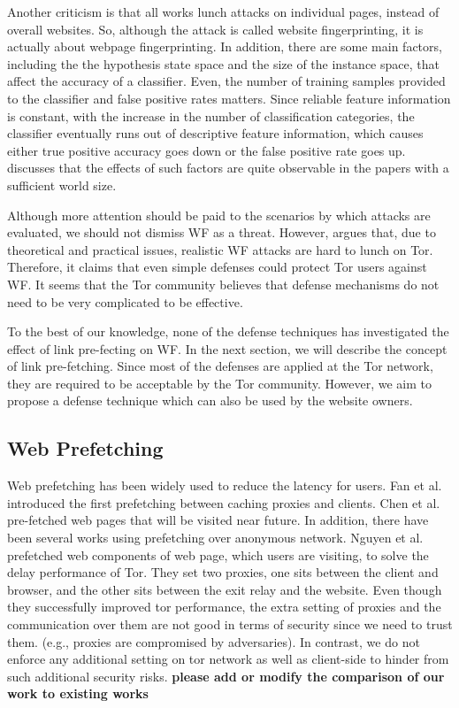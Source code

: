Another criticism is that all works lunch attacks on individual pages, instead of overall websites. So, although the attack is called website fingerprinting, it is actually about webpage fingerprinting. In addition, there are some main factors, including the the hypothesis state space and the size of the instance space, that affect the accuracy of a classifier. Even, the number of training samples provided to the classifier and false positive rates matters. Since reliable feature information is constant, with the increase in the number of classification categories, the classifier eventually runs out of descriptive feature information, which causes either true positive accuracy goes down or the false positive rate goes up. \cite{TorBlog} discusses that the effects of such factors are quite observable in the papers with a sufficient world size.

Although more attention should be paid to the scenarios by which attacks are evaluated, we should not dismiss WF as a threat. However, \cite{TorBlog} argues that, due to theoretical and practical issues, realistic WF attacks are hard to lunch on Tor. Therefore, it claims that even simple defenses could protect Tor users against WF. It seems that the Tor community believes that defense mechanisms do not need to be very complicated to be effective.

To the best of our knowledge, none of the defense techniques has investigated the effect of link pre-fecting on WF. In the next section, we will describe the concept of link pre-fetching. Since most of the defenses are applied at the Tor network, they are required to be acceptable by the Tor community. However, we aim to propose a defense technique which can also be used by the website owners. 
\subsection{Web Prefetching}
Web prefetching has been widely used to reduce the latency for users. Fan et al.\cite{Fan1999} introduced the first prefetching between caching proxies and clients. Chen et al. \cite{Chen2003} pre-fetched web pages that will be visited near future. In addition, there have been several works using prefetching over anonymous network. Nguyen et al. \cite{} prefetched web components of web page, which users are visiting, to solve the delay performance of Tor. They set two proxies, one sits between the client and browser, and the other sits between the exit relay and the website. Even though they successfully improved tor performance, the extra setting of proxies and the communication over them are not good in terms of security since we need to trust them. (e.g., proxies are compromised by adversaries). In contrast, we do not enforce any additional setting on tor network as well as client-side to hinder from such additional security risks.  \textbf{please add  or modify the comparison of our work to existing works}


